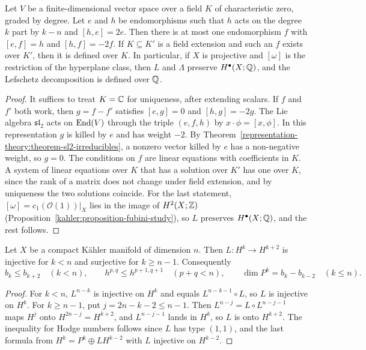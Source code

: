 \begin{proposition}\label{lefschetz-theorems:proposition-lambda-unique}
Let $V$ be a finite-dimensional vector space over a field $K$ of characteristic zero, graded by degree. Let $e$ and $h$ be endomorphisms
such that $h$ acts on the degree $k$ part by $k - n$ and $[h, e] = 2e$. Then there is at most one endomorphism $f$ with $[e, f] = h$ and
$[h, f] = -2f$. If $K \subseteq K'$ is a field extension and such an $f$ exists over $K'$, then it is defined over $K$. In particular, if $X$ is
projective and $[\omega]$ is the restriction of the hyperplane class, then $L$ and $\Lambda$ preserve $H^\bullet(X; \mathbb{Q})$, and the
Lefschetz decomposition is defined over $\mathbb{Q}$.
\end{proposition}

\begin{proof}
It suffices to treat $K = \mathbb{C}$ for uniqueness, after extending scalars. If $f$ and $f'$ both work, then $g = f - f'$ satisfies $[e, g] = 0$ and
$[h, g] = -2g$. The Lie algebra $\mathfrak{sl}_2$ acts on $\operatorname{End}(V)$ through the triple $(e, f, h)$ by $x \cdot \phi = [x, \phi]$. In this
representation $g$ is killed by $e$ and has weight $-2$. By Theorem~\ref{representation-theory:theorem-sl2-irreducibles}, a nonzero vector
killed by $e$ has a non-negative weight, so $g = 0$. The conditions on $f$ are linear equations with coefficients in $K$. A system of linear
equations over $K$ that has a solution over $K'$ has one over $K$, since the rank of a matrix does not change under field extension, and by
uniqueness the two solutions coincide. For the last statement, $[\omega] = c_1(\mathcal{O}(1))|_X$ lies in the image of
$H^2(X; \mathbb{Z})$ (Proposition~\ref{kahler:proposition-fubini-study}), so $L$ preserves $H^\bullet(X; \mathbb{Q})$, and the rest follows.
\end{proof}

\begin{corollary}\label{lefschetz-theorems:corollary-betti-inequalities}
Let $X$ be a compact K\"ahler manifold of dimension $n$. Then $L \colon H^k \to H^{k+2}$ is injective for $k < n$ and surjective for
$k \geq n - 1$. Consequently
\[
b_k \leq b_{k+2} \quad (k < n), \qquad h^{p,q} \leq h^{p+1,q+1} \quad (p + q < n), \qquad \dim P^k = b_k - b_{k-2} \quad (k \leq n).
\]
\end{corollary}

\begin{proof}
For $k < n$, $L^{n-k}$ is injective on $H^k$ and equals $L^{n-k-1} \circ L$, so $L$ is injective on $H^k$. For $k \geq n - 1$, put
$j = 2n - k - 2 \leq n - 1$. Then $L^{n-j} = L \circ L^{n-j-1}$ maps $H^j$ onto $H^{2n-j} = H^{k+2}$, and $L^{n-j-1}$ lands in $H^k$, so $L$ is
onto $H^{k+2}$. The inequality for Hodge numbers follows since $L$ has type $(1,1)$, and the last formula from
$H^k = P^k \oplus LH^{k-2}$ with $L$ injective on $H^{k-2}$.
\end{proof}


